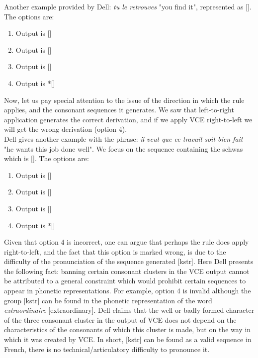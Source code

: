 \documentclass{article}
\begin{document}
Another example provided by Dell: \textit{tu le retrouves} "you find it", represented as []. The options are:
\begin{enumerate}
  \item Output is []
  \item Output is []
  \item Output is []
  \item Output is *[]
\end{enumerate}
Now,  let us pay special attention to the issue of the direction in which the rule applies, and the consonant sequences it generates.
We saw that left-to-right application generates the correct derivation, and if we apply VCE right-to-left we will get the wrong derivation (option 4). \\
Dell gives another example with the phrase: \textit{il veut que ce travail soit bien fait} "he wants this job done well".  We focus on the sequence containing the schwas which is []. The options are:
\begin{enumerate}
  \item Output is []
  \item Output is []
  \item Output is []
  \item Output is *[]
\end{enumerate}
Given that option 4 is incorrect, one can argue that perhaps the rule does apply right-to-left, and the fact that this option is marked wrong, is due to the difficulty of the pronunciation of the sequence generated [kstr].  Here Dell presents the following fact: banning certain consonant clusters in the VCE output cannot be attributed to a general constraint which would prohibit certain sequences to appear in phonetic representations. For example, option 4 is invalid although the group [kstr] can be found in the phonetic representation of the word \textit{extraordinaire} [extraordinary]. Dell claims that the well or badly formed character of the three consonant cluster in the output of VCE does not depend on the characteristics of the consonants of which this cluster is made, but on the way in which it was created by VCE.  In short, [kstr] can be found as a valid sequence in French, there is no technical/articulatory difficulty to pronounce it.
\end{document}
